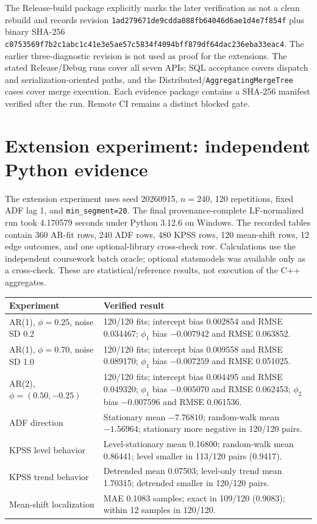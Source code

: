 \documentclass[11pt]{article}
\begin{document}
The Release-build package  explicitly marks the later verification as not a clean rebuild and records revision \texttt{1ad279671de9cdda\allowbreak 088fb64046d6ae1d\allowbreak 4e7f854f} plus binary SHA-256 \texttt{c0753569f7b2c1ab\allowbreak c1c41e3e5ae57c58\allowbreak 34f4094bff879df6\allowbreak 4dac236eba33eac4}. The earlier three-diagnostic revision is not used as proof for the extensions. The stated Release/Debug runs cover all seven APIs; SQL acceptance covers dispatch and serialization-oriented paths, and the Distributed/\texttt{AggregatingMergeTree} cases cover merge execution. Each evidence package contains a SHA-256 manifest verified after the run. Remote CI remains a distinct blocked gate.

\section{Extension experiment: independent Python evidence}

The extension experiment uses seed 20260915, $n=240$, 120 repetitions, fixed ADF lag 1, and \texttt{min\_segment=20}. The final provenance-complete LF-normalized run took 4.170579 seconds under Python 3.12.6 on Windows. The recorded tables contain 360 AR-fit rows, 240 ADF rows, 480 KPSS rows, 120 mean-shift rows, 12 edge outcomes, and one optional-library cross-check row. Calculations use the independent coursework batch oracle; optional statsmodels was available only as a cross-check. These are statistical/reference results, not execution of the C++ aggregates.

\noindent\begin{tabularx}{\textwidth}{@{}p{}Y@{}}
\toprule
Experiment & Verified result \\
\midrule
AR(1), $\phi=0.25$, noise SD 0.2 & 120/120 fits; intercept bias 0.002854 and RMSE 0.034467; $\phi_1$ bias $-0.007942$ and RMSE 0.063852. \\
AR(1), $\phi=0.70$, noise SD 1.0 & 120/120 fits; intercept bias 0.009558 and RMSE 0.089170; $\phi_1$ bias $-0.007259$ and RMSE 0.051025. \\
AR(2), $\phi=(0.50,-0.25)$ & 120/120 fits; intercept bias 0.004495 and RMSE 0.049320; $\phi_1$ bias $-0.005070$ and RMSE 0.062453; $\phi_2$ bias $-0.007596$ and RMSE 0.061536. \\
ADF direction & Stationary mean $-7.76810$; random-walk mean $-1.56964$; stationary more negative in 120/120 pairs. \\
KPSS level behavior & Level-stationary mean 0.16800; random-walk mean 0.86441; level smaller in 113/120 pairs (0.9417). \\
KPSS trend behavior & Detrended mean 0.07503; level-only trend mean 1.70315; detrended smaller in 120/120 pairs. \\
Mean-shift localization & MAE 0.1083 samples; exact in 109/120 (0.9083); within 12 samples in 120/120. \\
\bottomrule
\end{tabularx}
\end{document}
